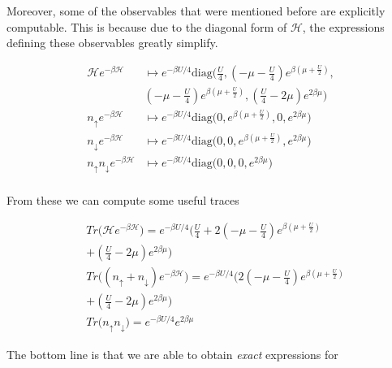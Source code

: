 \documentclass[10pt, twocolumn, twoside]{article}
\begin{document}
Moreover, some of the observables that were mentioned before are explicitly computable. This is because due to the diagonal form of $\mathcal{H}$, the expressions defining these observables greatly simplify.

\begin{equation}
\begin{split}
\mathcal{H} e^{-\beta\mathcal{H} } &\mapsto e^{-\beta U / 4}  \text{diag}\bigg(\frac{U}{4}, (-\mu - \frac{U}{4})  e^{\beta(\mu + \frac{U}{2})}, \\ 
&(-\mu - \frac{U}{4}) e^{\beta(\mu + \frac{U}{2})}, (\frac{U}{4} - 2\mu ) e^{2\beta \mu} \bigg) \\
n_{\uparrow} e^{-\beta\mathcal{H} } &\mapsto e^{-\beta U / 4}  \text{diag}\bigg(0, e^{\beta(\mu + \frac{U}{2})}, 0,  e^{2\beta \mu} \bigg) \\
n_{\downarrow} e^{-\beta\mathcal{H} } &\mapsto e^{-\beta U / 4}  \text{diag}\bigg(0, 0, e^{\beta(\mu + \frac{U}{2})},   e^{2\beta \mu} \bigg) \\
n_{\uparrow} n_{\downarrow} e^{-\beta\mathcal{H} } &\mapsto e^{-\beta U / 4}  \text{diag}\bigg(0, 0, 0,   e^{2\beta \mu} \bigg) \\
\end{split}
\end{equation}

From these we can compute some useful traces

\begin{equation}
\begin{split}
&Tr \bigg( \mathcal{H} e^{-\beta\mathcal{H} } \bigg) = e^{-\beta U / 4} \bigg(\frac{U}{4} + 2 (-\mu - \frac{U}{4})  e^{\beta(\mu + \frac{U}{2})} \\
& + (\frac{U}{4} - 2\mu ) e^{2\beta \mu} \bigg) \\
&Tr \bigg( (n_\uparrow + n_\downarrow ) e^{-\beta\mathcal{H} } \bigg) = e^{-\beta U / 4} \bigg(2 (-\mu - \frac{U}{4})  e^{\beta(\mu + \frac{U}{2})} \\
& + (\frac{U}{4} - 2\mu ) e^{2\beta \mu} \bigg) \\
&Tr \bigg( n_\uparrow n_\downarrow \bigg) = e^{-\beta U/4} e^{2\beta\mu}
\end{split}
\end{equation}

The bottom line is that we are able to obtain \emph{exact} expressions for
\end{document}
